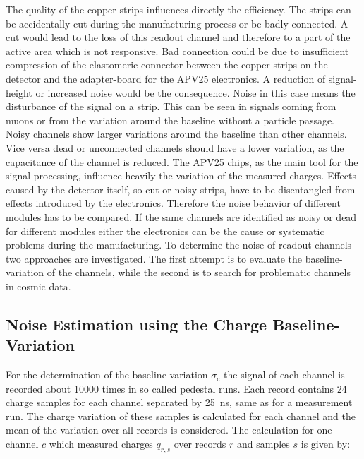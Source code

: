 \documentclass[
twoside,            %
BCOR1.4cm,          %
10pt,               %
headings=normal,    %
headsepline,        %
clearplainpage,		%
final,              %
div=14,
open=right,
bibliography=toc
]{scrreprt}
\begin{document}
The quality of the copper strips influences directly the efficiency.
The strips can be accidentally cut during the manufacturing process or be badly connected.
A cut would lead to the loss of this readout channel and therefore to a part of the active area which is not responsive.
Bad connection could be due to insufficient compression of the elastomeric connector between the copper strips on the detector and the adapter-board for the APV25 electronics.
A reduction of signal-height or increased noise would be the consequence.
Noise in this case means the disturbance of the signal on a strip.
This can be seen in signals coming from muons or from the variation around the baseline without a particle passage.
Noisy channels show larger variations around the baseline than other channels.
Vice versa dead or unconnected channels should have a lower variation, as the capacitance of the channel is reduced.
The APV25 chips, as the main tool for the signal processing, influence heavily the variation of the measured charges.
Effects caused by the detector itself, so cut or noisy strips, have to be disentangled from effects introduced by the electronics.
Therefore the noise behavior of different modules has to be compared.
If the same channels are identified as noisy or dead for different modules either the electronics can be the cause or systematic problems during the manufacturing.
To determine the noise of readout channels two approaches are investigated.
The first attempt is to evaluate the baseline-variation of the channels, while the second is to search for problematic channels in cosmic data.

\subsection{Noise Estimation using the Charge Baseline-Variation}

For the determination of the baseline-variation $\sigma_{\mathrm{c}}$ the signal of each channel is recorded about 10000 times in so called pedestal runs.
Each record contains 24 charge samples for each channel separated by \SI{25}{ns}, same as for a measurement run.
The charge variation of these samples is calculated for each channel and the mean of the variation over all records is considered.
The calculation for one channel $c$ which measured charges $q_{r,s}$ over records $r$ and samples $s$ is given by:
\end{document}

